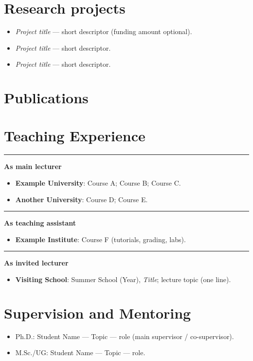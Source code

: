 \documentclass[11pt]{article}
\newcommand{\cvsection}[1]{\needspace{8\baselineskip}\section*{#1}}
\newcommand{\cvsubhead}[1]{%
  \vspace{6pt}\noindent
  {\color{cvrule}\rule{1.2pt}{10pt}}\hspace{0.7em}%
  {\color{cvgray}\normalsize\bfseries #1}\par\vspace{2pt}%
}
\newenvironment{cvsublist}{%
  \begin{itemize}[leftmargin=18pt, itemsep=2pt, topsep=2pt, parsep=0pt, partopsep=0pt]
}{%
  \end{itemize}\vspace{2pt}
}
\begin{document}
\cvsection{Research projects}
\begin{itemize}
  \item \textit{Project title} — short descriptor (funding amount optional).
  \item \textit{Project title} — short descriptor.
  \item \textit{Project title} — short descriptor.
\end{itemize}

\cvsection{Publications}
\nocite{*}

\printbibliography[type=article,       heading=cvsubbib, title={Journal Articles}, resetnumbers=true, sorting=ydnt]
\printbibliography[type=inproceedings, heading=cvsubbib, title={Conference Proceedings}, resetnumbers=true, sorting=ydnt]
\printbibliography[type=thesis,        heading=cvsubbib, title={Theses}, resetnumbers=true, sorting=ydnt]
\printbibliography[type=unpublished,   heading=cvsubbib, title={Manuscripts / Preprints}, resetnumbers=true, sorting=ydnt]
\printbibliography[type=misc,          heading=cvsubbib, title={Other Publications / Technical Reports}, resetnumbers=true, sorting=ydnt]

\cvsection{Teaching Experience}
\cvsubhead{As main lecturer}
\begin{cvsublist}
  \item \textbf{Example University}: Course A; Course B; Course C.
  \item \textbf{Another University}: Course D; Course E.
\end{cvsublist}

\cvsubhead{As teaching assistant}
\begin{cvsublist}
  \item \textbf{Example Institute}: Course F (tutorials, grading, labs).
\end{cvsublist}

\cvsubhead{As invited lecturer}
\begin{cvsublist}
  \item \textbf{Visiting School}: Summer School (Year), \textit{Title}; lecture topic (one line).
\end{cvsublist}

\cvsection{Supervision and Mentoring}
\begin{itemize}
  \item Ph.D.: Student Name — Topic — role (main supervisor / co-supervisor).
  \item M.Sc./UG: Student Name — Topic — role.
\end{itemize}
\end{document}
